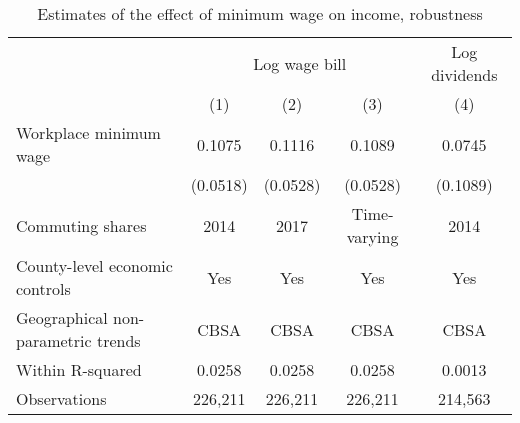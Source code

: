 \begin{table}[]
    \caption{Estimates of the effect of minimum wage on income, robustness}
    \label{tab:static_wages_robustness}

    \begin{tabular}{@{}lcccc@{}}
    \toprule
                                       & \multicolumn{3}{c}{Log wage bill} & Log dividends      \\ \cmidrule(l){2-5} 
                                       & (1)       & (2)      & (3)          & (4)              \\ \midrule
    Workplace minimum wage             & 0.1075   & 0.1116    & 0.1089       & 0.0745            \\
                                       & (0.0518) & (0.0528)  & (0.0528)     & (0.1089)          \\ \midrule
    Commuting shares                   & 2014     & 2017      & Time-varying & 2014              \\
    County-level economic controls     & Yes      & Yes       & Yes          & Yes               \\
    Geographical non-parametric trends & CBSA     & CBSA      & CBSA         & CBSA              \\
    Within R-squared                   & 0.0258   & 0.0258    & 0.0258        & 0.0013              \\
    Observations                       & 226,211  & 226,211   & 226,211       & 214,563              \\ \bottomrule
    \end{tabular}
\end{table}
